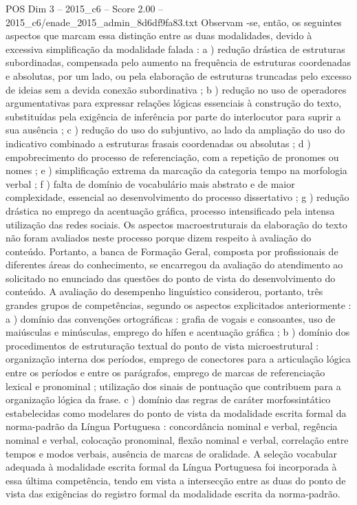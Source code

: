 \begin{textsample}{POS Dim 3 – 2015\_c6 – Score 2.00 – 2015\_c6/enade\_2015\_admin\_8d6df9fa83.txt}
Observam -se, então, os seguintes aspectos que marcam essa distinção entre as duas modalidades, devido à excessiva simplificação da modalidade falada : a ) redução drástica de estruturas subordinadas, compensada pelo aumento na frequência de estruturas coordenadas e absolutas, por um lado, ou pela elaboração de estruturas truncadas pelo excesso de ideias sem a devida conexão subordinativa ; b ) redução no uso de operadores argumentativas para expressar relações lógicas essenciais à construção do texto, substituídas pela exigência de inferência por parte do interlocutor para suprir a sua ausência ; c ) redução do uso do subjuntivo, ao lado da ampliação do uso do indicativo combinado a estruturas frasais coordenadas ou absolutas ; d ) empobrecimento do processo de referenciação, com a repetição de pronomes ou nomes ; e ) simplificação extrema da marcação da categoria tempo na morfologia verbal ; f ) falta de domínio de vocabulário mais abstrato e de maior complexidade, essencial ao desenvolvimento do processo dissertativo ; g ) redução drástica no emprego da acentuação gráfica, processo intensificado pela intensa utilização das redes sociais.
Os aspectos macroestruturais da elaboração do texto não foram avaliados neste processo porque dizem respeito à avaliação do conteúdo.
Portanto, a banca de Formação Geral, composta por profissionais de diferentes áreas do conhecimento, se encarregou da avaliação do atendimento ao solicitado no enunciado das questões do ponto de vista do desenvolvimento do conteúdo.
A avaliação do desempenho linguístico considerou, portanto, três grandes grupos de competências, segundo os aspectos explicitados anteriormente : a ) domínio das convenções ortográficas : grafia de vogais e consoantes, uso de maiúsculas e minúsculas, emprego do hífen e acentuação gráfica ; b ) domínio dos procedimentos de estruturação textual do ponto de vista microestrutural : organização interna dos períodos, emprego de conectores para a articulação lógica entre os períodos e entre os parágrafos, emprego de marcas de referenciação lexical e pronominal ; utilização dos sinais de pontuação que contribuem para a organização lógica da frase. c ) domínio das regras de caráter morfossintático estabelecidas como modelares do ponto de vista da modalidade escrita formal da norma-padrão da Língua Portuguesa : concordância nominal e verbal, regência nominal e verbal, colocação pronominal, flexão nominal e verbal, correlação entre tempos e modos verbais, ausência de marcas de oralidade.
A seleção vocabular adequada à modalidade escrita formal da Língua Portuguesa foi incorporada à essa última competência, tendo em vista a intersecção entre as duas do ponto de vista das exigências do registro formal da modalidade escrita da norma-padrão.

\end{textsample}
